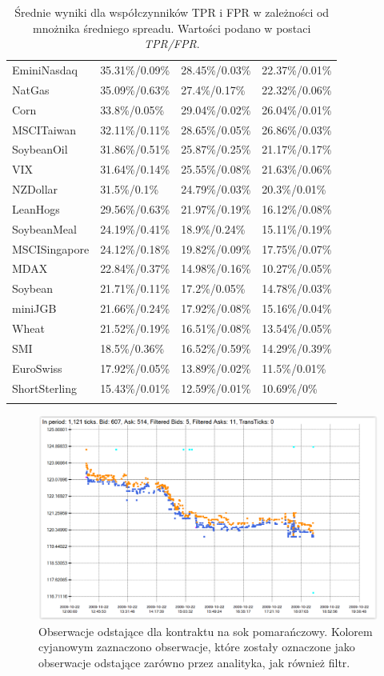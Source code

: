 \documentclass[a4paper,12pt,openany, DIV=calc, headsepline]{scrbook}
\begin{document}
\begin{longtable}{llll}
  EminiNasdaq & 35.31\%/0.09\% & 28.45\%/0.03\% & 22.37\%/0.01\% \\ 
  NatGas & 35.09\%/0.63\% & 27.4\%/0.17\% & 22.32\%/0.06\% \\ 
  Corn & 33.8\%/0.05\% & 29.04\%/0.02\% & 26.04\%/0.01\% \\ 
  MSCITaiwan & 32.11\%/0.11\% & 28.65\%/0.05\% & 26.86\%/0.03\% \\ 
  SoybeanOil & 31.86\%/0.51\% & 25.87\%/0.25\% & 21.17\%/0.17\% \\ 
  VIX & 31.64\%/0.14\% & 25.55\%/0.08\% & 21.63\%/0.06\% \\ 
  NZDollar & 31.5\%/0.1\% & 24.79\%/0.03\% & 20.3\%/0.01\% \\ 
  LeanHogs & 29.56\%/0.63\% & 21.97\%/0.19\% & 16.12\%/0.08\% \\ 
  SoybeanMeal & 24.19\%/0.41\% & 18.9\%/0.24\% & 15.11\%/0.19\% \\ 
  MSCISingapore & 24.12\%/0.18\% & 19.82\%/0.09\% & 17.75\%/0.07\% \\ 
  MDAX & 22.84\%/0.37\% & 14.98\%/0.16\% & 10.27\%/0.05\% \\ 
  Soybean & 21.71\%/0.11\% & 17.2\%/0.05\% & 14.78\%/0.03\% \\ 
  miniJGB & 21.66\%/0.24\% & 17.92\%/0.08\% & 15.16\%/0.04\% \\ 
  Wheat & 21.52\%/0.19\% & 16.51\%/0.08\% & 13.54\%/0.05\% \\ 
  SMI & 18.5\%/0.36\% & 16.52\%/0.59\% & 14.29\%/0.39\% \\ 
  EuroSwiss & 17.92\%/0.05\% & 13.89\%/0.02\% & 11.5\%/0.01\% \\ 
  ShortSterling & 15.43\%/0.01\% & 12.59\%/0.01\% & 10.69\%/0\% \\ 
   \hline
   \caption{Średnie wyniki dla współczynników TPR i FPR w zależności od mnożnika średniego spreadu. Wartości podano w postaci \emph{TPR/FPR}.}
\label{tab:result1}

\end{longtable}

\begin{figure}[h]
  \centering
  \includegraphics[scale=0.5]{wykresy/ojfh10.PNG}
  \caption{Obserwacje odstające dla kontraktu na sok pomarańczowy. Kolorem cyjanowym zaznaczono obserwacje, które zostały oznaczone jako obserwacje odstające zarówno przez analityka, jak również filtr.}
  \label{fig:ojfh10}
\end{figure}
\end{document}
